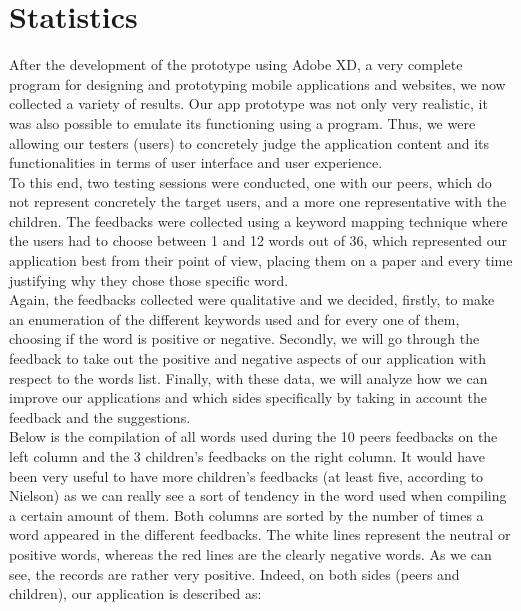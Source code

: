 \documentclass[12pt]{scrartcl}
\begin{document}
	\newpage
	
	
\section{Statistics}


	After the development of the prototype using Adobe XD, a very complete program for designing and prototyping mobile applications and websites, we now collected a variety of results. Our app prototype was not only very realistic, it was also possible to emulate its functioning using a program. Thus, we were allowing our testers (users) to concretely judge the application content and its functionalities in terms of user interface and user experience. \\

	To this end, two testing sessions were conducted, one with our peers, which do not represent concretely the target users, and a more one representative with the children. The feedbacks were collected using a keyword mapping technique where the users had to choose between 1 and 12 words out of 36, which represented our application best from their point of view, placing them on a paper and every time justifying why they chose those specific word.\\

	Again, the feedbacks collected were qualitative and we decided, firstly, to make an enumeration of the different keywords used and for every one of them, choosing if the word is positive or negative. Secondly, we will go through the feedback to take out the positive and negative aspects of our application with respect to the words list. Finally, with these data, we will analyze how we can improve our applications and which sides specifically by taking in account the feedback and the suggestions.\\

	Below is the compilation of all words used during the 10 peers feedbacks on the left column and the 3 children’s feedbacks on the right column. It would have been very useful to have more children’s feedbacks (at least five, according to Nielson) as we can really see a sort of tendency in the word used when compiling a certain amount of them. Both columns are sorted by the number of times a word appeared in the different feedbacks. The white lines represent the neutral or positive words, whereas the red lines are the clearly negative words. As we can see, the records are rather very positive. Indeed, on both sides (peers and children), our application is described as:\\
	
\end{document}
